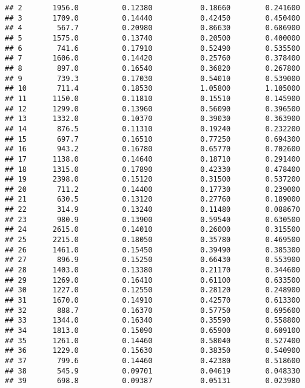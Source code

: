 \documentclass[
]{article}
\begin{document}
\begin{verbatim}
## 2       1956.0          0.12380           0.18660        0.241600
## 3       1709.0          0.14440           0.42450        0.450400
## 4        567.7          0.20980           0.86630        0.686900
## 5       1575.0          0.13740           0.20500        0.400000
## 6        741.6          0.17910           0.52490        0.535500
## 7       1606.0          0.14420           0.25760        0.378400
## 8        897.0          0.16540           0.36820        0.267800
## 9        739.3          0.17030           0.54010        0.539000
## 10       711.4          0.18530           1.05800        1.105000
## 11      1150.0          0.11810           0.15510        0.145900
## 12      1299.0          0.13960           0.56090        0.396500
## 13      1332.0          0.10370           0.39030        0.363900
## 14       876.5          0.11310           0.19240        0.232200
## 15       697.7          0.16510           0.77250        0.694300
## 16       943.2          0.16780           0.65770        0.702600
## 17      1138.0          0.14640           0.18710        0.291400
## 18      1315.0          0.17890           0.42330        0.478400
## 19      2398.0          0.15120           0.31500        0.537200
## 20       711.2          0.14400           0.17730        0.239000
## 21       630.5          0.13120           0.27760        0.189000
## 22       314.9          0.13240           0.11480        0.088670
## 23       980.9          0.13900           0.59540        0.630500
## 24      2615.0          0.14010           0.26000        0.315500
## 25      2215.0          0.18050           0.35780        0.469500
## 26      1461.0          0.15450           0.39490        0.385300
## 27       896.9          0.15250           0.66430        0.553900
## 28      1403.0          0.13380           0.21170        0.344600
## 29      1269.0          0.16410           0.61100        0.633500
## 30      1227.0          0.12550           0.28120        0.248900
## 31      1670.0          0.14910           0.42570        0.613300
## 32       888.7          0.16370           0.57750        0.695600
## 33      1344.0          0.16340           0.35590        0.558800
## 34      1813.0          0.15090           0.65900        0.609100
## 35      1261.0          0.14460           0.58040        0.527400
## 36      1229.0          0.15630           0.38350        0.540900
## 37       799.6          0.14460           0.42380        0.518600
## 38       545.9          0.09701           0.04619        0.048330
## 39       698.8          0.09387           0.05131        0.023980

\end{verbatim}
\end{document}
